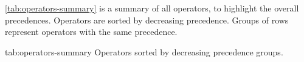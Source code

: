 \autoref{tab:operators-summary} is a summary of all operators, to highlight
the overall precedences. Operators are sorted by decreasing
precedence. Groups of rows represent operators with the same precedence.

\begin{operatorTable}[\ifx\ifHtml\undefined\small\fi]%
  {tab:operators-summary}%
  {Operators sorted by decreasing precedence groups.}
  \operatordot\\\operatordota
  \\\hline
  \operatorprop\\\operatorpropass
  \\\hline
  \operatoruand\\\operatordotand
  \\\hline
  \operatorsub\\\operatorsubass
  \\\hline
  \operatorexp
  \\\hline
  \operatorbcompl\\\operatoruplus\\\operatorumin\\\operatorneg
  \\\hline
  \operatormult\\\operatordiv\\\operatormod
  \\\hline
  \operatorplus\\\operatorminus
  \\\hline
  \operatorlshift\\\operatorrshift
  \\\hline
  \operatorband
  \\\hline
  \operatorbxor
  \\\hline
  \operatorbor
  \\\hline
  \operatoreq\\\operatorneq\\\operatorpeq\\\operatorpneq\\\operatoreqaeq\\
  \operatoraeq\\\operatorinf\\\operatorinfeq\\\operatorsup\\\operatorsupeq
  \\\hline
  \operatorin\\\operatornotin
  \\\hline
  \operatorand
  \\\hline
  \operatoror
  \\\hline
  \operatorass\\\operatorsiass
  \\\hline
  \operatorinca\\\operatordeca\\\operatorainc\\\operatoradec
\end{operatorTable}


